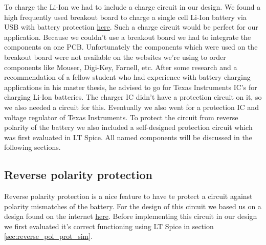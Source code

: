 \documentclass[11pt,a4paper]{article}
\begin{document}
To charge the Li-Ion we had to include a charge circuit in our design. We found a high frequently used breakout board to charge a single cell Li-Ion battery via USB with battery protection \href{http://acoptex.com/project/9446/basics-project-082a-lithum-battery-charger-tp4056-at-acoptexcom/#sthash.3qJ5RSCy.AsMaJFMH.dpbs}{here}. Such a charge circuit would be perfect for our application. Because we couldn't use a breakout board we had to integrate the components on one PCB. Unfortunately the components which were used on the breakout board were not available on the websites we're using to order components like Mouser, Digi-Key, Farnell, etc. After some research and a recommendation of a fellow student who had experience with battery charging applications in his master thesis, he advised to go for Texas Instruments IC's for charging Li-Ion batteries. The charger IC didn't have a protection circuit on it, so we also needed a circuit for this. Eventually we also went for a protection IC and voltage regulator of Texas Instruments. To protect the circuit from reverse polarity of the battery we also included a self-designed protection circuit which was first evaluated in LT Spice. All named components will be discussed in the following sections.

\subsection{Reverse polarity protection}
Reverse polarity protection is a nice feature to have te protect a circuit against polarity mismatches of the battery. For the design of this circuit we based us on a design found on the internet \href{http://kaktuscircuits.blogspot.com/2014/07/reverse-polarity-and-overvoltage.html}{here}. Before implementing this circuit in our design we first evaluated it's correct functioning using LT Spice in section \ref{sec:reverse_pol_prot_sim}.
\end{document}
